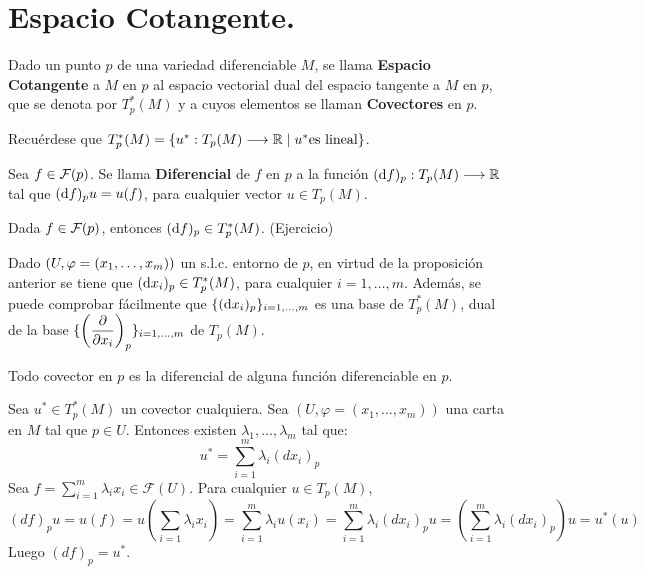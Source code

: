 \documentclass[Cursovd_portada.tex]{subfiles}
\begin{document}
\section{Espacio Cotangente.}
\begin{defi}
Dado un punto $p$ de una variedad diferenciable $M$, se llama {\bf Espacio Cotangente} a $M$ en $p$ al espacio
vectorial dual del espacio tangente a $M$ en $p$, que se denota por $T_p^*(M)$ y a cuyos elementos se llaman {\bf
Covectores} en $p$.
\end{defi}
Recuérdese que $T_p^*(M)=\{u^*:T_p(M)\longrightarrow\mathbb{R} \mid u^* {\rm es}\mbox{ }{\rm lineal}\}$.
\begin{defi}
Sea $f\in{\cal F}(p)$. Se llama {\bf Diferencial} de $f$ en $p$ a la función $({\rm d} f)_p:T_p(M)\longrightarrow\mathbb{R}$ tal que
$({\rm d} f)_pu=u(f)$, para cualquier vector $u\in T_p(M)$.
\end{defi}
\begin{prop}
Dada $f\in{\cal F}(p)$, entonces $({\rm d} f)_p\in T_p^*(M)$. (Ejercicio)
\end{prop}
Dado $(U,\varphi=(x_1,\dots ,x_m))$ un s.l.c. entorno de $p$, en virtud de la proposición anterior se tiene que
$({\rm d} x_i)_p\in T_p^*(M)$, para cualquier $i=1,\dots ,m$. Además, se puede comprobar fácilmente que
$\{({\rm d} x_i)_p\}_{i=1,\dots ,m}$ es una base de $T_p^*(M)$, dual de la base
$\{\left(\displaystyle{\frac{\partial}{\partial x_i}}\right)_p\}_{i=1,\dots ,m}$ de $T_p(M)$.
\begin{prop}
Todo covector en $p$ es la diferencial de alguna función diferenciable en $p$.
\end{prop}
\begin{dem}
Sea $u^* \in T_p^*(M)$ un covector cualquiera. Sea $(U,φ=(x_1,\dots,x_m))$ una carta en $M$ tal que $p \in U$. Entonces existen $λ_1,\dots,λ_m$ tal que:
\[ u^* = \sum_{i=1}^m λ_i(dx_i)_p \]
Sea $f = \sum_{i=1}^m λ_i x_i \in \mathcal{F}(U)$. Para cualquier $u \in T_p(M)$,
\[ (df)_pu = u(f) = u\left(\sum_{i=1} λ_i x_i\right) = \sum_{i=1}^m λ_i u(x_i)= \sum_{i=1}^m λ_i (dx_i)_p u = \left(\sum_{i=1}^m λ_i (dx_i)_p\right) u = u^*(u)\]
Luego $(df)_p = u^*$.
\end{dem}
\newpage
\end{document}
